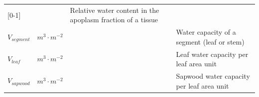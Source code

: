 \documentclass[]{book}
\begin{document}
\begin{longtable}[]{@{}llll@{}}
\begin{minipage}[t]{0.10\columnwidth}
{[}0-1{]}\strut
\end{minipage} & \begin{minipage}[t]{0.12\columnwidth}\raggedright\strut
\strut
\end{minipage} & \begin{minipage}[t]{0.45\columnwidth}\raggedright\strut
Relative water content in the apoplasm fraction of a tissue\strut
\end{minipage}\tabularnewline
\begin{minipage}[t]{0.11\columnwidth}\raggedright\strut
\(V_{segment}\)\strut
\end{minipage} & \begin{minipage}[t]{0.10\columnwidth}\raggedright\strut
\(m^3 \cdot m^{-2}\)\strut
\end{minipage} & \begin{minipage}[t]{0.12\columnwidth}\raggedright\strut
\strut
\end{minipage} & \begin{minipage}[t]{0.45\columnwidth}\raggedright\strut
Water capacity of a segment (leaf or stem)\strut
\end{minipage}\tabularnewline
\begin{minipage}[t]{0.11\columnwidth}\raggedright\strut
\(V_{leaf}\)\strut
\end{minipage} & \begin{minipage}[t]{0.10\columnwidth}\raggedright\strut
\(m^3 \cdot m^{-2}\)\strut
\end{minipage} & \begin{minipage}[t]{0.12\columnwidth}\raggedright\strut
\strut
\end{minipage} & \begin{minipage}[t]{0.45\columnwidth}\raggedright\strut
Leaf water capacity per leaf area unit\strut
\end{minipage}\tabularnewline
\begin{minipage}[t]{0.11\columnwidth}\raggedright\strut
\(V_{sapwood}\)\strut
\end{minipage} & \begin{minipage}[t]{0.10\columnwidth}\raggedright\strut
\(m^3 \cdot m^{-2}\)\strut
\end{minipage} & \begin{minipage}[t]{0.12\columnwidth}\raggedright\strut
\strut
\end{minipage} & \begin{minipage}[t]{0.45\columnwidth}\raggedright\strut
Sapwood water capacity per leaf area unit\strut
\end{minipage}\tabularnewline
\bottomrule
\end{longtable}
\end{document}
